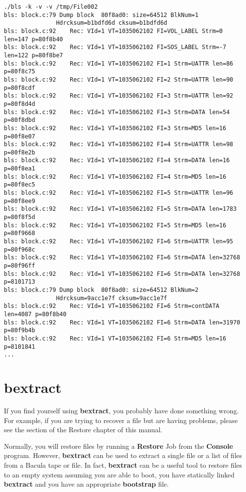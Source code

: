 \footnotesize
\begin{verbatim}
./bls -k -v -v /tmp/File002
bls: block.c:79 Dump block  80f8ad0: size=64512 BlkNum=1
               Hdrcksum=b1bdfd6d cksum=b1bdfd6d
bls: block.c:92    Rec: VId=1 VT=1035062102 FI=VOL_LABEL Strm=0 len=147 p=80f8b40
bls: block.c:92    Rec: VId=1 VT=1035062102 FI=SOS_LABEL Strm=-7 len=122 p=80f8be7
bls: block.c:92    Rec: VId=1 VT=1035062102 FI=1 Strm=UATTR len=86 p=80f8c75
bls: block.c:92    Rec: VId=1 VT=1035062102 FI=2 Strm=UATTR len=90 p=80f8cdf
bls: block.c:92    Rec: VId=1 VT=1035062102 FI=3 Strm=UATTR len=92 p=80f8d4d
bls: block.c:92    Rec: VId=1 VT=1035062102 FI=3 Strm=DATA len=54 p=80f8dbd
bls: block.c:92    Rec: VId=1 VT=1035062102 FI=3 Strm=MD5 len=16 p=80f8e07
bls: block.c:92    Rec: VId=1 VT=1035062102 FI=4 Strm=UATTR len=98 p=80f8e2b
bls: block.c:92    Rec: VId=1 VT=1035062102 FI=4 Strm=DATA len=16 p=80f8ea1
bls: block.c:92    Rec: VId=1 VT=1035062102 FI=4 Strm=MD5 len=16 p=80f8ec5
bls: block.c:92    Rec: VId=1 VT=1035062102 FI=5 Strm=UATTR len=96 p=80f8ee9
bls: block.c:92    Rec: VId=1 VT=1035062102 FI=5 Strm=DATA len=1783 p=80f8f5d
bls: block.c:92    Rec: VId=1 VT=1035062102 FI=5 Strm=MD5 len=16 p=80f9668
bls: block.c:92    Rec: VId=1 VT=1035062102 FI=6 Strm=UATTR len=95 p=80f968c
bls: block.c:92    Rec: VId=1 VT=1035062102 FI=6 Strm=DATA len=32768 p=80f96ff
bls: block.c:92    Rec: VId=1 VT=1035062102 FI=6 Strm=DATA len=32768 p=8101713
bls: block.c:79 Dump block  80f8ad0: size=64512 BlkNum=2
               Hdrcksum=9acc1e7f cksum=9acc1e7f
bls: block.c:92    Rec: VId=1 VT=1035062102 FI=6 Strm=contDATA len=4087 p=80f8b40
bls: block.c:92    Rec: VId=1 VT=1035062102 FI=6 Strm=DATA len=31970 p=80f9b4b
bls: block.c:92    Rec: VId=1 VT=1035062102 FI=6 Strm=MD5 len=16 p=8101841
...
\end{verbatim}
\normalsize

\section{bextract}
\label{bextract}

If you find yourself using {\bf bextract}, you probably have done
something wrong. For example, if you are trying to recover a file
but are having problems, please see the  section of the Restore chapter of this manual.

Normally, you will restore files by running a {\bf Restore} Job from the {\bf
Console} program. However, {\bf bextract} can be used to extract a single file
or a list of files from a Bacula tape or file. In fact, {\bf bextract} can be
a useful tool to restore files to an empty system assuming you are able to
boot, you have statically linked {\bf bextract} and you have an appropriate
{\bf bootstrap} file.

